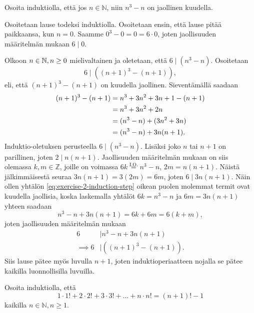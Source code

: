 \documentclass[12pt,a4paper]{article}
\begin{document}
\begin{exercise}
  Osoita induktiolla, että jos \(n \in \mathbb{N}\), niin \(n^3 - n\)
  on jaollinen kuudella.
\end{exercise}
\begin{solution}
  Osoitetaan lause todeksi induktiolla. Osoitetaan ensin, että lause pitää
  paikkaansa, kun \(n = 0\). Saamme \(0^3 - 0 = 0 = 6\cdot0\), joten
  jaollisuuden määritelmän mukaan \(6 \mid 0\).

  Olkoon \(n \in \mathbb{N}, n \geq 0\) mielivaltainen ja oletetaan, että
  \(6 \mid (n^3 - n)\).
  Osoitetaan
  \[
    6 \mid \left((n + 1)^3 - (n + 1)\right),
  \]
  eli, että \((n + 1)^3 - (n + 1)\) on kuudella jaollinen. Sieventämällä saadaan
  \begin{align}
    (n + 1)^3 - (n + 1) &= n^3 + 3n^2 + 3n + 1 - (n + 1) \notag \\
    &= n^3 + 3n^2 + 2n \notag \\
    &= (n^3 - n) + (3n^2 + 3n) \notag \\
    &= (n^3 - n) + 3n(n + 1). \label{eq:exercise-2-induction-step}
  \end{align}
  Induktio-oletuksen perusteella \(6 \mid (n^3 - n)\). Lisäksi joko \(n\) tai
  \(n + 1\) on parillinen, joten \(2 \mid n(n + 1)\). Jaollisuuden
  määritelmän mukaan on siis olemassa
  \(k,m \in \mathbb{Z}\), joille on voimassa
  \(6k \overset{\text{I.O.}}{=} n^3 - n\), \(2m = n(n + 1)\).
  Näistä jälkimmäisestä seuraa \(3n(n + 1) = 3(2m) = 6m\), joten \(6
  \mid 3n(n + 1)\).
  Näin ollen yhtälön \eqref{eq:exercise-2-induction-step} oikean puolen
  molemmat termit ovat kuudella jaollisia, koska
  laskemalla yhtälöt \(6k = n^3 - n\) ja \(6m = 3n(n + 1)\) yhteen
  saadaan
  \[
    n^3 - n + 3n(n + 1) = 6k + 6m = 6(k + m),
  \]
  joten jaollisuuden määritelmän mukaan
  \begin{align}
    6 & \mid n^3 - n + 3n(n + 1) \\
    \implies
    6 & \mid \left((n + 1)^3 - (n + 1)\right).
  \end{align}
  Siis lause pätee myös luvulla \(n + 1\), joten induktioperiaatteen
  nojalla se pätee kaikilla luonnollisilla luvuilla.
\end{solution}

\begin{exercise}
  Osoita induktiolla, että
  \[
    1 \cdot 1! + 2 \cdot 2! + 3 \cdot 3! + \dots + n \cdot n! = (n + 1)! - 1
  \]
  kaikilla \(n \in \mathbb{N}, n \geq 1\).
\end{exercise}
\end{document}
